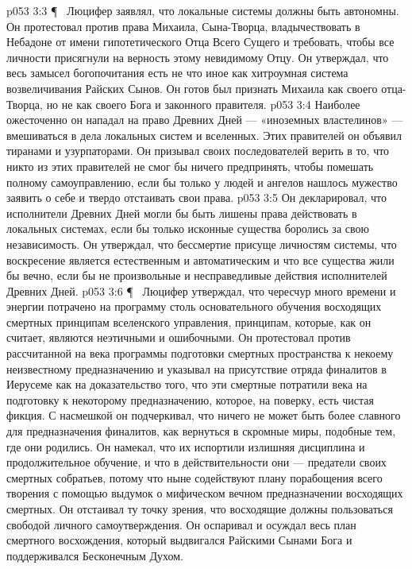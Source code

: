 \vs p053 3:3 \P\ \bibnobreakspace {} Люцифер заявлял, что локальные системы должны быть автономны. Он протестовал против права Михаила, Сына\hyp{}Творца, владычествовать в Небадоне от имени гипотетического Отца Всего Сущего и требовать, чтобы все личности присягнули на верность этому невидимому Отцу. Он утверждал, что весь замысел богопочитания есть не что иное как хитроумная система возвеличивания Райских Сынов. Он готов был признать Михаила как своего отца\hyp{}Творца, но не как своего Бога и законного правителя.
\vs p053 3:4 Наиболее ожесточенно он нападал на право Древних Дней --- «иноземных властелинов» --- вмешиваться в дела локальных систем и вселенных. Этих правителей он объявил тиранами и узурпаторами. Он призывал своих последователей верить в то, что никто из этих правителей не смог бы ничего предпринять, чтобы помешать полному самоуправлению, если бы только у людей и ангелов нашлось мужество заявить о себе и твердо отстаивать свои права.
\vs p053 3:5 Он декларировал, что исполнители Древних Дней могли бы быть лишены права действовать в локальных системах, если бы только исконные существа боролись за свою независимость. Он утверждал, что бессмертие присуще личностям системы, что воскресение является естественным и автоматическим и что все существа жили бы вечно, если бы не произвольные и несправедливые действия исполнителей Древних Дней.
\vs p053 3:6 \P\ \bibnobreakspace {} Люцифер утверждал, что чересчур много времени и энергии потрачено на программу столь основательного обучения восходящих смертных принципам вселенского управления, принципам, которые, как он считает, являются неэтичными и ошибочными. Он протестовал против рассчитанной на века программы подготовки смертных пространства к некоему неизвестному предназначению и указывал на присутствие отряда финалитов в Иерусеме как на доказательство того, что эти смертные потратили века на подготовку к некоторому предназначению, которое, на поверку, есть чистая фикция. С насмешкой он подчеркивал, что ничего не может быть более славного для предназначения финалитов, как вернуться в скромные миры, подобные тем, где они родились. Он намекал, что их испортили излишняя дисциплина и продолжительное обучение, и что в действительности они --- предатели своих смертных собратьев, потому что ныне содействуют плану порабощения всего творения с помощью выдумок о мифическом вечном предназначении восходящих смертных. Он отстаивал ту точку зрения, что восходящие должны пользоваться свободой личного самоутверждения. Он оспаривал и осуждал весь план смертного восхождения, который выдвигался Райскими Сынами Бога и поддерживался Бесконечным Духом.
